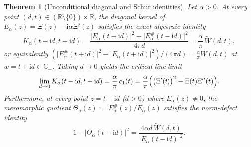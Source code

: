 \documentclass[11pt,reqno]{amsart}
\newtheorem{theorem}{Theorem}[section]
\theoremstyle{definition}
\theoremstyle{remark}
\numberwithin{equation}{section}
\newcommand{\ii}{\mathrm{i}}
\begin{document}
\begin{theorem}[Unconditional diagonal and Schur identities]\label{thm:debranges_kernel}
Let $\alpha > 0$. At every point $(d,t) \in (\mathbb{R}\setminus\{0\}) \times \mathbb{R}$, the diagonal kernel of $E_\alpha(z) = \Xi(z) - \ii\alpha\Xi'(z)$ satisfies the exact algebraic identity
\begin{equation}\label{eq:debranges_boxed}
  \boxed{
    K_\alpha(t - \ii d, t - \ii d)
    = \frac{\lvert E_\alpha(t - \ii d)\rvert^2 - \lvert E_\alpha^\#(t - \ii d)\rvert^2}{4\pi d}
    = \frac{\alpha}{\pi}\,\widetilde{W}(d,t),
  }
\end{equation}
or equivalently $(\lvert E_\alpha^\#(t+\ii d)\rvert^2 - \lvert E_\alpha(t+\ii d)\rvert^2)/(4\pi d) = \frac{\alpha}{\pi}\widetilde{W}(d,t)$ at $w = t + \ii d \in \mathbb{C}_+$. Taking $d \to 0$ yields the critical-line limit
\begin{equation}\label{eq:debranges_d0}
  \lim_{d \to 0} K_\alpha(t - \ii d, t - \ii d)
  = \frac{\alpha}{\pi}\,c_1(t)
  = \frac{\alpha}{\pi}\Bigl(\bigl(\Xi'(t)\bigr)^2 - \Xi(t)\Xi''(t)\Bigr).
\end{equation}
Furthermore, at every point $z = t - \ii d$ ($d > 0$) where $E_\alpha(z) \neq 0$, the meromorphic quotient $\Theta_\alpha(z) := E_\alpha^\#(z)/E_\alpha(z)$ satisfies the norm-defect identity
\begin{equation}\label{eq:schur_defect}
  1 - \lvert\Theta_\alpha(t - \ii d)\rvert^2 = \frac{4\alpha d\,\widetilde{W}(d,t)}{\lvert E_\alpha(t - \ii d)\rvert^2}.
\end{equation}
\end{theorem}
\end{document}

